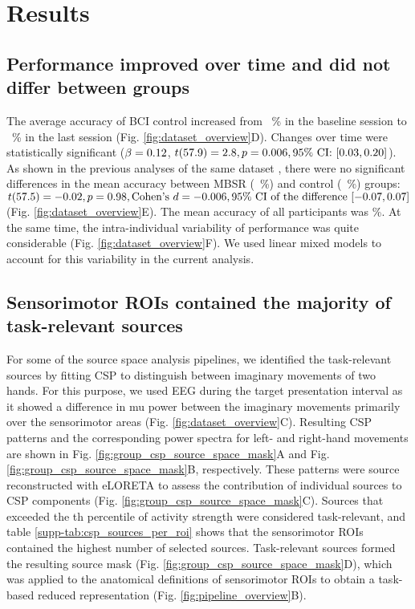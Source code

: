 \section{Results}

\subsection{Performance improved over time and did not differ between groups}

The average accuracy of BCI control increased from \metadataMeanAccuracyFirst~\% in the baseline session to \metadataMeanAccuracyLast~\% in the last session (Fig. \ref{fig:dataset_overview}D). Changes over time were statistically significant ($\beta = 0.12$, $t(57.9) = 2.8, p = 0.006, 95\%~\text{CI:}~ [0.03, 0.20]$). As shown in the previous analyses of the same dataset \citep{Stieger2020_analysis}, there were no significant differences in the mean accuracy between MBSR (\metadataMeanAccuracyMBSR~\%) and control (\metadataMeanAccuracyControl~\%) groups: $t(57.5) = -0.02, p = 0.98, \text{Cohen's}~d = -0.006, 95\% ~\text{CI of the difference}~\allowbreak[-0.07,  0.07]$ (Fig. \ref{fig:dataset_overview}E). The mean accuracy of all participants was \metadataMeanAccuracy\%. At the same time, the intra-individual variability of performance was quite considerable (Fig. \ref{fig:dataset_overview}F). We used linear mixed models to account for this variability in the current analysis.

\subsection{Sensorimotor ROIs contained the majority of task-relevant sources}

For some of the source space analysis pipelines, we identified the task-relevant sources by fitting CSP to distinguish between imaginary movements of two hands. For this purpose, we used EEG during the target presentation interval as it showed a difference in mu power between the imaginary movements primarily over the sensorimotor areas (Fig. \ref{fig:dataset_overview}C). Resulting CSP patterns and the corresponding power spectra for left- and right-hand movements are shown in Fig. \ref{fig:group_csp_source_space_mask}A and Fig. \ref{fig:group_csp_source_space_mask}B, respectively. These patterns were source reconstructed with eLORETA to assess the contribution of individual sources to CSP components (Fig. \ref{fig:group_csp_source_space_mask}C). Sources that exceeded the \cspSourceThreshold th percentile of activity strength were considered task-relevant, and table \ref{supp-tab:csp_sources_per_roi} shows that the sensorimotor ROIs contained the highest number of selected sources. Task-relevant sources formed the resulting source mask (Fig. \ref{fig:group_csp_source_space_mask}D), which was applied to the anatomical definitions of sensorimotor ROIs to obtain a task-based reduced representation (Fig. \ref{fig:pipeline_overview}B).

